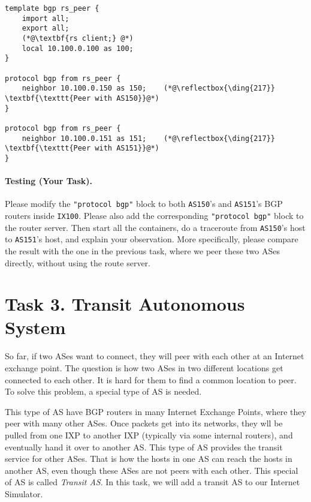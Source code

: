 \begin{lstlisting}
template bgp rs_peer {
    import all;
    export all;
    (*@\textbf{rs client;} @*)  
    local 10.100.0.100 as 100;
}
    
protocol bgp from rs_peer {
    neighbor 10.100.0.150 as 150;    (*@\reflectbox{\ding{217}} \textbf{\texttt{Peer with AS150}}@*) 
}

protocol bgp from rs_peer {
    neighbor 10.100.0.151 as 151;    (*@\reflectbox{\ding{217}} \textbf{\texttt{Peer with AS151}}@*) 
}
\end{lstlisting}


\paragraph{Testing (Your Task).}
Please modify the \texttt{"protocol bgp"} block to both \texttt{AS150}'s
and \texttt{AS151}'s BGP routers inside \texttt{IX100}. Please also
add the corresponding \texttt{"protocol bgp"} block to the router 
server. Then
start all the containers, do a traceroute from
\texttt{AS150}'s host to \texttt{AS151}'s host, and explain your observation. 
More specifically, please compare the result with the one 
in the previous task, where we peer these two ASes directly, without
using the route server. 





\section{Task 3. Transit Autonomous System}


So far, if two ASes want to connect, they will peer with each other 
at an Internet exchange point. The question is how two ASes in two different locations 
get connected to each other. It is hard for them
to find a common location to peer. To solve this problem, 
a special type of AS is needed. 

This type of AS have BGP routers in many Internet 
Exchange Points, where they peer with many other ASes. Once packets get into 
its networks, they wll be pulled from one IXP to another IXP (typically via 
some internal routers), and eventually
hand it over to another AS. This type of AS provides the transit
service for other ASes. That is how the hosts in one AS can reach the hosts in 
another AS, even though these ASes are not peers with each other.  
This special of AS is called \textit{Transit AS}. 
In this task, we will add a transit AS to our Internet Simulator.




